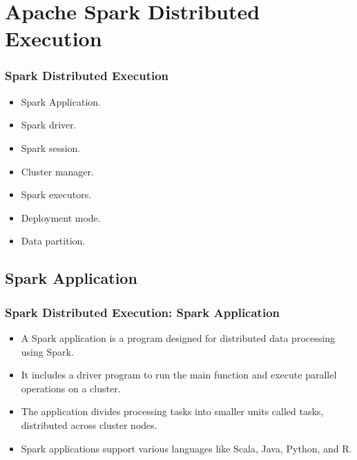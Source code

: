 

\section{Apache Spark Distributed Execution}\label{sec:apache-spark-distributed-execution}
\begin{frame}
    \frametitle{Spark Distributed Execution}
    \begin{itemize}
        \item Spark Application.
        \item Spark driver.
        \item Spark session.
        \item Cluster manager.
        \item Spark executors.
        \item Deployment mode.
        \item Data partition.
    \end{itemize}
\end{frame}


\subsection{Spark Application}\label{subsec:spark-application}
\begin{frame}
    \frametitle{Spark Distributed Execution: Spark Application}

    \begin{itemize}
        \item A Spark application is a program designed for distributed data processing using Spark.
        \item It includes a driver program to run the main function and execute parallel operations on a cluster.
        \item The application divides processing tasks into smaller units called tasks, distributed across cluster nodes.
        \item Spark applications support various languages like Scala, Java, Python, and R.
    \end{itemize}

\end{frame}

